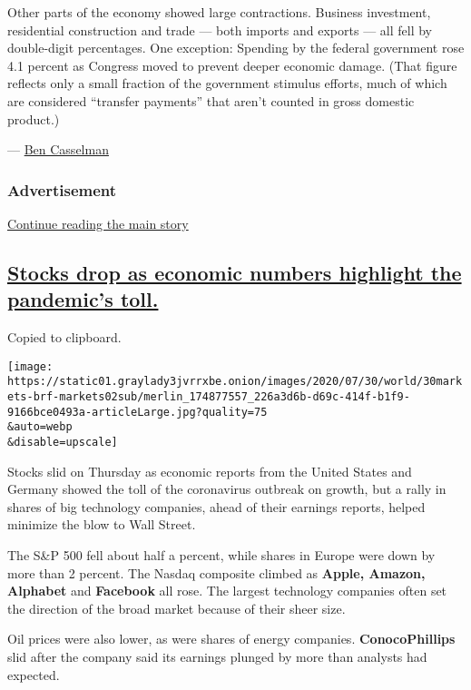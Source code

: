 Other parts of the economy showed large contractions. Business
investment, residential construction and trade --- both imports and
exports --- all fell by double-digit percentages. One exception:
Spending by the federal government rose 4.1 percent as Congress moved to
prevent deeper economic damage. (That figure reflects only a small
fraction of the government stimulus efforts, much of which are
considered ``transfer payments'' that aren't counted in gross domestic
product.)

--- \href{https://www.nytimes3xbfgragh.onion/by/ben-casselman}{Ben
Casselman}

\hypertarget{advertisement-2}{%
\subsubsection{Advertisement}\label{advertisement-2}}

\protect\hyperlink{after-dfp-ad-mid3}{Continue reading the main story}

\hypertarget{stocks-drop-as-economic-numbers-highlight-the-pandemics-toll}{%
\subsection{\texorpdfstring{\protect\hyperlink{stocks-drop-as-economic-numbers-highlight-the-pandemics-toll}{Stocks
drop as economic numbers highlight the pandemic's
toll.}}{Stocks drop as economic numbers highlight the pandemic's toll.}}\label{stocks-drop-as-economic-numbers-highlight-the-pandemics-toll}}

Copied to clipboard.

\texttt{[image: https://static01.graylady3jvrrxbe.onion/images/2020/07/30/world/30markets-brf-markets02sub/merlin\_174877557\_226a3d6b-d69c-414f-b1f9-9166bce0493a-articleLarge.jpg?quality=75\\\&auto=webp\\\&disable=upscale]}

Stocks slid on Thursday as economic reports from the United States and
Germany showed the toll of the coronavirus outbreak on growth, but a
rally in shares of big technology companies, ahead of their earnings
reports, helped minimize the blow to Wall Street.

The S\&P 500 fell about half a percent, while shares in Europe were down
by more than 2 percent. The Nasdaq composite climbed as \textbf{Apple,
Amazon, Alphabet} and \textbf{Facebook} all rose. The largest technology
companies often set the direction of the broad market because of their
sheer size.

Oil prices were also lower, as were shares of energy companies.
\textbf{ConocoPhillips} slid after the company said its earnings plunged
by more than analysts had expected.

